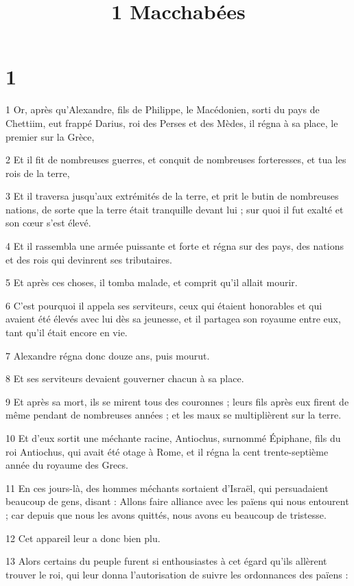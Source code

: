 

\title{1 Macchabées}

\chapter{1}

\par 1 Or, après qu'Alexandre, fils de Philippe, le Macédonien, sorti du pays de Chettiim, eut frappé Darius, roi des Perses et des Mèdes, il régna à sa place, le premier sur la Grèce,
\par 2 Et il fit de nombreuses guerres, et conquit de nombreuses forteresses, et tua les rois de la terre,
\par 3 Et il traversa jusqu'aux extrémités de la terre, et prit le butin de nombreuses nations, de sorte que la terre était tranquille devant lui ; sur quoi il fut exalté et son cœur s'est élevé.
\par 4 Et il rassembla une armée puissante et forte et régna sur des pays, des nations et des rois qui devinrent ses tributaires.
\par 5 Et après ces choses, il tomba malade, et comprit qu'il allait mourir.
\par 6 C'est pourquoi il appela ses serviteurs, ceux qui étaient honorables et qui avaient été élevés avec lui dès sa jeunesse, et il partagea son royaume entre eux, tant qu'il était encore en vie.
\par 7 Alexandre régna donc douze ans, puis mourut.
\par 8 Et ses serviteurs devaient gouverner chacun à sa place.
\par 9 Et après sa mort, ils se mirent tous des couronnes ; leurs fils après eux firent de même pendant de nombreuses années ; et les maux se multiplièrent sur la terre.
\par 10 Et d'eux sortit une méchante racine, Antiochus, surnommé Épiphane, fils du roi Antiochus, qui avait été otage à Rome, et il régna la cent trente-septième année du royaume des Grecs.
\par 11 En ces jours-là, des hommes méchants sortaient d'Israël, qui persuadaient beaucoup de gens, disant : Allons faire alliance avec les païens qui nous entourent ; car depuis que nous les avons quittés, nous avons eu beaucoup de tristesse.
\par 12 Cet appareil leur a donc bien plu.
\par 13 Alors certains du peuple furent si enthousiastes à cet égard qu'ils allèrent trouver le roi, qui leur donna l'autorisation de suivre les ordonnances des païens :

